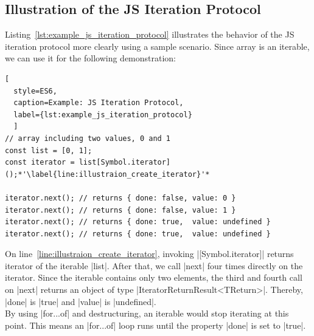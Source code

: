 \subsection{Illustration of the JS Iteration Protocol}
\label{sub:Illustration of the JS Iteration Protocol}
Listing~\ref{lst:example_js_iteration_protocol} illustrates the behavior of the
JS iteration protocol more clearly using a sample scenario. Since array is an
iterable, we can use it for the following demonstration:

\begin{lstlisting}[
  style=ES6, 
  caption=Example: JS Iteration Protocol,
  label={lst:example_js_iteration_protocol}
  ]
// array including two values, 0 and 1
const list = [0, 1];
const iterator = list[Symbol.iterator]();*'\label{line:illustraion_create_iterator}'*

iterator.next(); // returns { done: false, value: 0 }
iterator.next(); // returns { done: false, value: 1 }
iterator.next(); // returns { done: true,  value: undefined }
iterator.next(); // returns { done: true,  value: undefined }
\end{lstlisting}

On line~\ref{line:illustraion_create_iterator}, invoking |[Symbol.iterator]|
returns iterator of the iterable |list|. 
After that, we call |next| four times directly on the iterator. Since the
iterable contains only two elements, the third and fourth call on |next|
returns an object of type |IteratorReturnResult<TReturn>|. Thereby, |done| is
|true| and |value| is |undefined|. \\
By using |for...of| and destructuring, an iterable would stop iterating at this
point. This means an |for...of| loop runs until the property |done| is set to
|true|.


